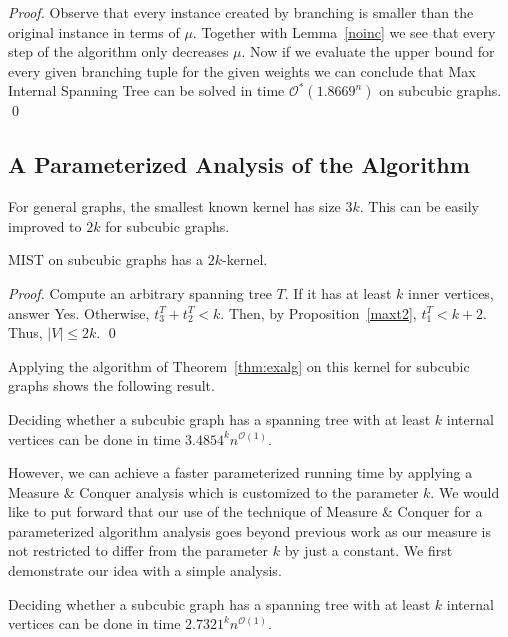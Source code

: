 \documentclass{llncs}
\newcommand{\longversion}[1]{#1}
\newcommand{\mc}{\mathcal}
\newcommand{\Oh}{{\mc{O}}}
\newcommand{\rt}{1.8669}
\newcommand{\rtk}{3.4854}
\newcommand{\rtki}{2.7321}
\begin{document}
{\begin{proof}
Observe that every instance created by branching is smaller than the original instance in terms of $\mu$. Together with Lemma~\ref{noinc} we see that every step of the algorithm only decreases $\mu$.
Now if we evaluate the upper bound for every given branching tuple for the given weights we can conclude that {\sc Max Internal Spanning Tree} can be
solved in time $\Oh^*(\rt^n)$ on subcubic graphs.
\qed
\end{proof}
}

\longversion{\subsection{A Parameterized Analysis of the Algorithm}}

For general graphs, the smallest known kernel has size $3k$. This can be easily improved to $2k$ for subcubic graphs.

\begin{lemma}\label{lem:kernel}
MIST on subcubic graphs has a $2k$-kernel.
\end{lemma}
\longversion{
 \begin{proof}
 Compute an arbitrary spanning tree $T$. If it has at least $k$ inner vertices, answer Yes. Otherwise, $t^T_3 +t^T_2 < k$. Then, by Proposition~\ref{maxt2}, $ t^T_1 < k+2$. Thus, $|V| \le 2k$. \qed
 \end{proof}
}

Applying the algorithm of Theorem~\ref{thm:exalg} on this kernel for subcubic graphs shows the following result.

\begin{corollary}
Deciding whether a subcubic graph has a spanning tree with at least $k$ internal vertices can be done in time $\rtk^k n^{\Oh(1)}$.
\end{corollary}



However, we can achieve a faster parameterized running time by applying a Measure \& Conquer analysis which is customized to the parameter $k$. We would like to put forward that our use of the technique of Measure \& Conquer for a parameterized algorithm analysis goes beyond previous work as our measure is not restricted to differ from the parameter $k$ by just a constant. We first demonstrate our idea with a simple analysis.

\begin{theorem}
Deciding whether a subcubic graph has a spanning tree with at least $k$ internal vertices can be done in time $\rtki^k n^{\Oh(1)}$.
\end{theorem}
\end{document}
